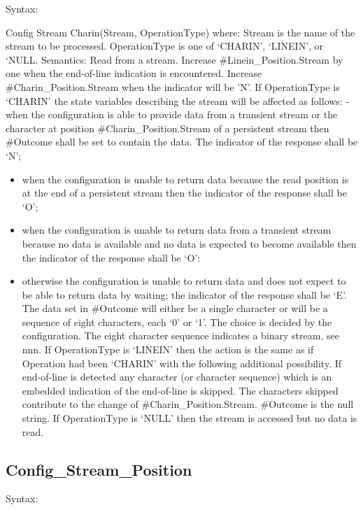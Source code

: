 Syntax:

Config Stream Charin(Stream, OperationType) where: Stream is the name of
the stream to be processed. OperationType is one of `CHARIN', `LINEIN',
or `NULL. Semantics: Read from a stream. Increase
\#Linein\_Position.Stream by one when the end-of-line indication is
encountered. Increase \#Charin\_Position.Stream when the indicator will
be 'N'. If OperationType is `CHARIN' the state variables describing the
stream will be affected as follows: - when the configuration is able to
provide data from a transient stream or the character at position
\#Charin\_Position.Stream of a persistent stream then \#Outcome shall be
set to contain the data. The indicator of the response shall be `N';

\begin{itemize}
\tightlist
\item
  when the configuration is unable to return data because the read
  position is at the end of a persistent stream then the indicator of
  the response shall be `O';
\item
  when the configuration is unable to return data from a transient
  stream because no data is available and no data is expected to become
  available then the indicator of the response shall be `O':
\item
  otherwise the configuration is unable to return data and does not
  expect to be able to return data by waiting; the indicator of the
  response shall be `E'. The data set in \#Outcome will either be a
  single character or will be a sequence of eight characters, each `0'
  or `1'. The choice is decided by the configuration. The eight
  character sequence indicates a binary stream, see nnn. If
  OperationType is `LINEIN' then the action is the same as if Operation
  had been `CHARIN' with the following additional possibility. If
  end-of-line is detected any character (or character sequence) which is
  an embedded indication of the end-of-line is skipped. The characters
  skipped contribute to the change of \#Charin\_Position.Stream.
  \#Outcome is the null string. If OperationType is `NULL' then the
  stream is accessed but no data is read.
\end{itemize}

\subsection{Config\_Stream\_Position}\label{config_stream_position}

Syntax:


